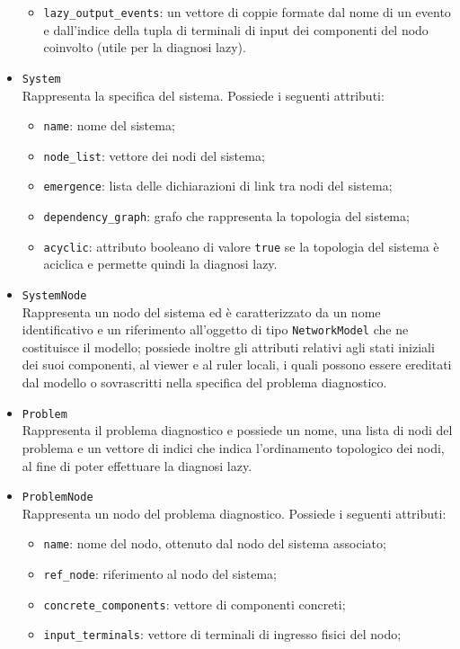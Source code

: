 \begin{itemize}
\begin{itemize}
\item \verb|lazy_output_events|: un vettore di coppie formate dal nome di un evento e dall'indice della tupla di terminali di input dei componenti del nodo coinvolto (utile per la diagnosi lazy).
\end{itemize}
\item \verb|System|\\
Rappresenta la specifica del sistema. Possiede i seguenti attributi:
\begin{itemize}
\item \verb|name|: nome del sistema;
\item \verb|node_list|: vettore dei nodi del sistema;
\item \verb|emergence|: lista delle dichiarazioni di link tra nodi del sistema;
\item \verb|dependency_graph|: grafo che rappresenta la topologia del sistema;
\item \verb|acyclic|: attributo booleano di valore \verb|true| se la topologia del sistema è aciclica e permette quindi la diagnosi lazy.
\end{itemize}
\item \verb|SystemNode|\\
Rappresenta un nodo del sistema ed è caratterizzato da un nome identificativo e un riferimento all'oggetto di tipo \verb|NetworkModel| che ne costituisce il modello; possiede inoltre gli attributi relativi agli stati iniziali dei suoi componenti, al viewer e al ruler locali, i quali possono essere ereditati dal modello o sovrascritti nella specifica del problema diagnostico.
\item \verb|Problem|\\
Rappresenta il problema diagnostico e possiede un nome, una lista di nodi del problema e un vettore di indici  che indica l'ordinamento topologico dei nodi, al fine di poter effettuare la diagnosi lazy.
\item \verb|ProblemNode|\\
Rappresenta un nodo del problema diagnostico. Possiede i seguenti attributi:
\begin{itemize}
\item \verb|name|: nome del nodo, ottenuto dal nodo del sistema associato;
\item \verb|ref_node|: riferimento al nodo del sistema;
\item \verb|concrete_components|: vettore di componenti concreti;
\item \verb|input_terminals|: vettore di terminali di ingresso fisici del nodo;

\end{itemize}
\end{itemize}
